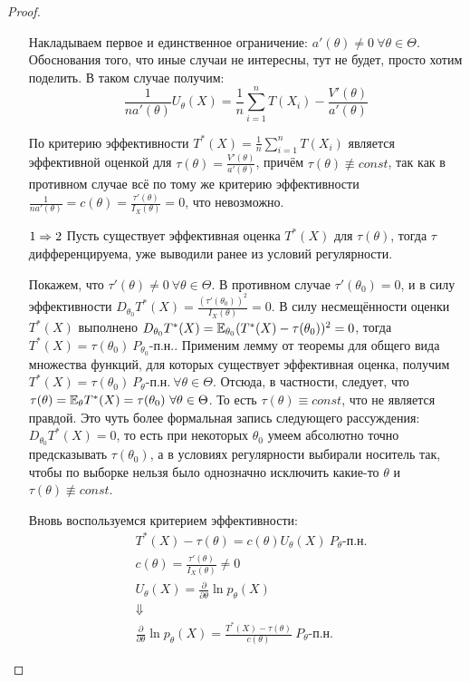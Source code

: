 \begin{proof}
\begin{itemize}
        Накладываем первое и единственное ограничение: $a'(\theta) \neq 0 \ \forall \theta \in \Theta$. Обоснования того, что иные случаи не интересны, тут не будет, просто хотим поделить. В таком случае получим:
        \[
            \frac{1}{n a'(\theta)} U_\theta(X) = \frac{1}{n} \sum_{i=1}^n T(X_i) - \frac{V'(\theta)}{a'(\theta)}
        \]

        По критерию эффективности $T^*(X) = \frac{1}{n} \sum_{i=1}^n T(X_i)$ является эффективной оценкой для $\tau(\theta) = \frac{V'(\theta)}{a'(\theta)}$, причём $\tau(\theta) \not\equiv const$, так как в противном случае всё по тому же критерию эффективности $\frac{1}{n a'(\theta)} = c(\theta) = \frac{\tau'(\theta)}{I_X(\theta)} = 0$, что невозможно.

        \item[$1 \Rightarrow 2$] Пусть существует эффективная оценка $T^*(X)$ для $\tau(\theta)$, тогда $\tau$ дифференцируема, уже выводили ранее из условий регулярности.

        Покажем, что $\tau'(\theta) \neq 0 \ \forall \theta \in \Theta$. В противном случае $\tau'(\theta_0) = 0$, и в силу эффективности $D_{\theta_0} T^*(X) = \frac{(\tau'(\theta_0))^2}{I_X(\theta)} = 0$. В силу несмещённости оценки $T^*(X)$ выполнено $D_{\theta_0} T^*(X) = \mathbb{E}_{\theta_0} (T^*(X) - \tau(\theta_0))^2 = 0$, тогда $T^*(X) = \tau(\theta_0) \ P_{\theta_0} \text{-п.н.}$. Применим лемму от теоремы для общего вида множества функций, для которых существует эффективная оценка, получим $T^*(X) = \tau(\theta_0) \ P_{\theta} \text{-п.н.} \ \forall \theta \in \Theta$. Отсюда, в частности, следует, что $\tau(\theta) = \E_\theta T^*(X) = \tau(\theta_0) \ \forall \theta \in \Theta$. То есть $\tau(\theta) \equiv const$, что не является правдой. Это чуть более формальная запись следующего рассуждения: $D_{\theta_0} T^*(X) = 0$, то есть при некоторых $\theta_0$ умеем абсолютно точно предсказывать $\tau(\theta_0)$, а в условиях регулярности выбирали носитель так, чтобы по выборке нельзя было однозначно исключить какие-то $\theta$ и $\tau(\theta) \not\equiv const$.

        Вновь воспользуемся критерием эффективности:
        \begin{align*}
            & T^*(X) - \tau(\theta) = c(\theta) U_\theta(X) \ P_\theta \text{-п.н.}
            \\
            & c(\theta) = \frac{\tau'(\theta)}{I_X(\theta)} \neq 0
            \\
            & U_\theta(X) = \frac{\partial}{\partial \theta} \ln p_\theta(X)
            \\
            & \Downarrow
            \\
            & \frac{\partial}{\partial \theta} \ln p_\theta(X) = \frac{T^*(X)-\tau(\theta)}{c(\theta)} \ P_\theta \text{-п.н.}
        \end{align*}


\end{itemize}
\end{proof}
